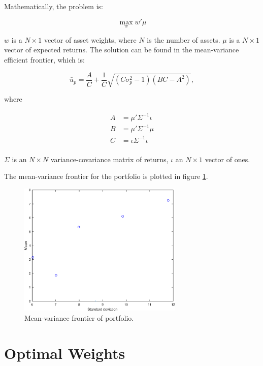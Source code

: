 \documentclass[a4paper]{article}
\begin{document}
Mathematically, the problem is:

\begin{equation*}
    \max_{w} w'\mu
\end{equation*}

\(w\) is a \(N\times1\) vector of asset weights, where \(N\) is the number of assets. $\mu$ is a \(N\times1\) vector of expected returns. The solution can be found in the mean-variance efficient frontier, which is:

\begin{equation*}
    \bar{u}_p = \frac{A}{C} + \frac{1}{C} \sqrt{(C\sigma^2_p - 1)(BC - A^2)},
\end{equation*}

where

\begin{align*}
    A &= \mu'\Sigma^{-1}\iota  \\
    B &= \mu'\Sigma^{-1}\mu    \\
    C &= \iota\Sigma^{-1}\iota \\
\end{align*}

$\Sigma$ is an \(N\times N\) variance-covariance matrix of returns, $\iota$ an \(N\times 1\) vector of ones.

The mean-variance frontier for the portfolio is plotted in figure \ref{figure_mv_frontier}.

\begin{figure}[H]
    \centering
    \includegraphics[width=0.7\textwidth, keepaspectratio]{figures/mv_frontier.eps}
    \caption{Mean-variance frontier of portfolio.}
    \label{figure_mv_frontier}
\end{figure}

\section{Optimal Weights}
\end{document}
